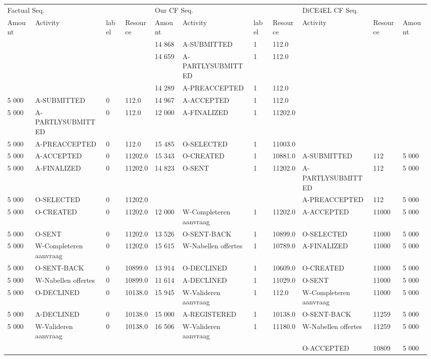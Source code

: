 \begin{tabular}{lllllllllll}
\toprule
\multicolumn{4}{l}{Factual Seq.} & \multicolumn{4}{l}{Our CF Seq.} & \multicolumn{3}{l}{DiCE4EL CF Seq.} \\
Amount & Activity & label & Resource & Amount & Activity & label & Resource & Activity & Resource & Amount \\
\midrule
 &  &  &  & 14 868 & A-SUBMITTED & 1 & 112.0 &  &  &  \\
 &  &  &  & 14 659 & A-PARTLYSUBMITTED & 1 & 112.0 &  &  &  \\
 &  &  &  & 14 289 & A-PREACCEPTED & 1 & 112.0 &  &  &  \\
5 000 & A-SUBMITTED & 0 & 112.0 & 14 967 & A-ACCEPTED & 1 & 112.0 &  &  &  \\
5 000 & A-PARTLYSUBMITTED & 0 & 112.0 & 12 000 & A-FINALIZED & 1 & 11202.0 &  &  &  \\
5 000 & A-PREACCEPTED & 0 & 112.0 & 15 485 & O-SELECTED & 1 & 11003.0 &  &  &  \\
5 000 & A-ACCEPTED & 0 & 11202.0 & 15 343 & O-CREATED & 1 & 10881.0 & A-SUBMITTED & 112 & 5 000 \\
5 000 & A-FINALIZED & 0 & 11202.0 & 14 823 & O-SENT & 1 & 11202.0 & A-PARTLYSUBMITTED & 112 & 5 000 \\
5 000 & O-SELECTED & 0 & 11202.0 &  &  &  &  & A-PREACCEPTED & 112 & 5 000 \\
5 000 & O-CREATED & 0 & 11202.0 & 12 000 & W-Completeren aanvraag & 1 & 11202.0 & A-ACCEPTED & 11000 & 5 000 \\
5 000 & O-SENT & 0 & 11202.0 & 13 526 & O-SENT-BACK & 1 & 10899.0 & O-SELECTED & 11000 & 5 000 \\
5 000 & W-Completeren aanvraag & 0 & 11202.0 & 15 615 & W-Nabellen offertes & 1 & 10789.0 & A-FINALIZED & 11000 & 5 000 \\
5 000 & O-SENT-BACK & 0 & 10899.0 & 13 914 & O-DECLINED & 1 & 10609.0 & O-CREATED & 11000 & 5 000 \\
5 000 & W-Nabellen offertes & 0 & 10899.0 & 11 614 & A-DECLINED & 1 & 11029.0 & O-SENT & 11000 & 5 000 \\
5 000 & O-DECLINED & 0 & 10138.0 & 15 945 & W-Valideren aanvraag & 1 & 112.0 & W-Completeren aanvraag & 11000 & 5 000 \\
5 000 & A-DECLINED & 0 & 10138.0 & 15 000 & A-REGISTERED & 1 & 10138.0 & O-SENT-BACK & 11259 & 5 000 \\
5 000 & W-Valideren aanvraag & 0 & 10138.0 & 16 506 & W-Valideren aanvraag & 1 & 11180.0 & W-Nabellen offertes & 11259 & 5 000 \\
 &  &  &  &  &  &  &  & O-ACCEPTED & 10809 & 5 000 \\
\bottomrule
\end{tabular}
